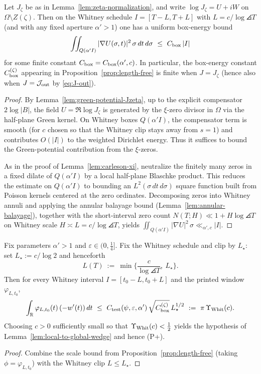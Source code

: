 \begin{proposition}\label{prop:box-energy-Jzeta}
Let \(J_\zeta\) be as in Lemma~\ref{lem:zeta-normalization}, and write \(\log J_\zeta = U+iW\) on \(\Omega\setminus Z(\zeta)\).
Then on the Whitney schedule \(I=[T-L,T+L]\) with \(L=c/\log\angles{T}\) (and with any fixed aperture \(\alpha'>1\)) one has a uniform box-energy bound
\[
  \iint_{Q(\alpha' I)}|\nabla U(\sigma,t)|^2\,\sigma\,dt\,d\sigma\ \le\ C_{\rm box}\,|I|
\]
for some finite constant \(C_{\rm box}=C_{\rm box}(\alpha',c)\).
In particular, the box-energy constant \(C_{\rm box}^{(\zeta)}\) appearing in Proposition~\ref{prop:length-free} is finite when \(J=J_\zeta\) (hence also when \(J=\mathcal J_{\rm out}\) by \eqref{eq:J-out}).
\end{proposition}
\begin{proof}
By Lemma~\ref{lem:green-potential-Jzeta}, up to the explicit compensator \(2\log|B|\), the field \(U=\Re\log J_\zeta\) is generated by the \(\xi\)-zero divisor in \(\Omega\) via the half-plane Green kernel.
On Whitney boxes \(Q(\alpha' I)\), the compensator term is smooth (for \(c\) chosen so that the Whitney clip stays away from \(s=1\)) and contributes \(O(|I|)\) to the weighted Dirichlet energy.
Thus it suffices to bound the Green-potential contribution from the \(\xi\)-zeros.

As in the proof of Lemma~\ref{lem:carleson-xi}, neutralize the finitely many zeros in a fixed dilate of \(Q(\alpha' I)\) by a local half-plane Blaschke product.
This reduces the estimate on \(Q(\alpha' I)\) to bounding an \(L^2(\sigma\,dt\,d\sigma)\) square function built from Poisson kernels centered at the zero ordinates.
Decomposing zeros into Whitney annuli and applying the annular balayage bound (Lemma~\ref{lem:annular-balayage}), together with the short-interval zero count \(N(T;H)\ll 1+H\log\angles{T}\) on Whitney scale \(H\asymp L=c/\log\angles{T}\), yields
\(\iint_{Q(\alpha' I)}|\nabla U|^2\,\sigma\ll_{\alpha',c}|I|\).
\end{proof}

\begin{lemma}\label{lem:whitney-uniform-wedge}
Fix parameters \(\alpha'>1\) and \(\varepsilon\in(0,\tfrac14]\).
Fix the Whitney schedule and clip by \(L_\star\): set \(L_\star:=c/\log 2\) and henceforth
\[
  L(T)\ :=\ \min\Big\{\frac{c}{\log\angles{T}},\ L_\star\Big\}.
\]
Then for every Whitney interval \(I=[t_0-L,t_0+L]\) and the printed window \(\varphi_{L,t_0}\),
\[
  \int_{\mathbb R} \varphi_{L,t_0}(t)\,(-w'(t))\,dt\ \le\ C_{\rm test}(\psi,\varepsilon,\alpha')\,\sqrt{C_{\rm box}^{(\zeta)}}\,L_\star^{1/2}
  \ :=\ \pi\,\Upsilon_{\rm Whit}(c).
\]
Choosing \(c>0\) sufficiently small so that \(\Upsilon_{\rm Whit}(c)<\tfrac12\) yields the hypothesis of Lemma~\ref{lem:local-to-global-wedge} and hence \textup{(P+)}.
\end{lemma}
\begin{proof}
Combine the scale bound from Proposition~\ref{prop:length-free} (taking \(\phi=\varphi_{L,t_0}\)) with the Whitney clip \(L\le L_\star\).
\end{proof}

